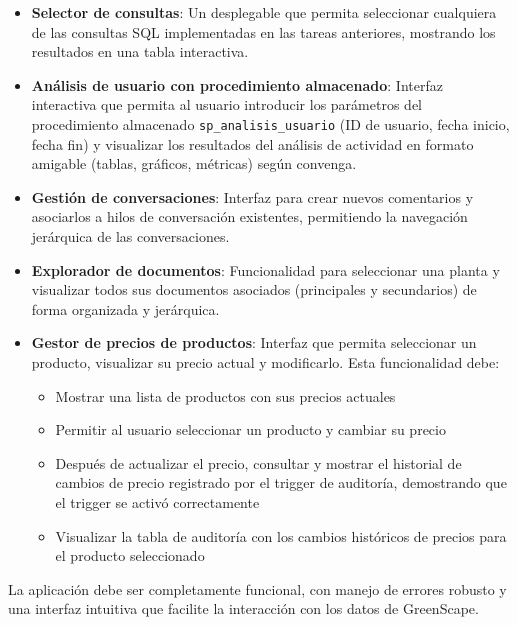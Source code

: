 \documentclass[10pt]{article}
\begin{document}
\begin{enumerate}
		\begin{itemize}
			\item \textbf{Selector de consultas}: Un desplegable que permita seleccionar cualquiera de las consultas SQL implementadas en las tareas anteriores, mostrando los resultados en una tabla interactiva.
			
			\item \textbf{Análisis de usuario con procedimiento almacenado}: Interfaz interactiva que permita al usuario introducir los parámetros del procedimiento almacenado \texttt{sp\_analisis\_usuario} (ID de usuario, fecha inicio, fecha fin) y visualizar los resultados del análisis de actividad en formato amigable (tablas, gráficos, métricas) según convenga.
			
			\item \textbf{Gestión de conversaciones}: Interfaz para crear nuevos comentarios y asociarlos a hilos de conversación existentes, permitiendo la navegación jerárquica de las conversaciones.
			
			\item \textbf{Explorador de documentos}: Funcionalidad para seleccionar una planta y visualizar todos sus documentos asociados (principales y secundarios) de forma organizada y jerárquica.
			
			\item \textbf{Gestor de precios de productos}: Interfaz que permita seleccionar un producto, visualizar su precio actual y modificarlo. Esta funcionalidad debe:
			\begin{itemize}
				\item Mostrar una lista de productos con sus precios actuales
				\item Permitir al usuario seleccionar un producto y cambiar su precio
				\item Después de actualizar el precio, consultar y mostrar el historial de cambios de precio registrado por el trigger de auditoría, demostrando que el trigger se activó correctamente
				\item Visualizar la tabla de auditoría con los cambios históricos de precios para el producto seleccionado
			\end{itemize}
		\end{itemize}
		
		La aplicación debe ser completamente funcional, con manejo de errores robusto y una interfaz intuitiva que facilite la interacción con los datos de GreenScape.
		
	\end{enumerate}
	
\end{document}
